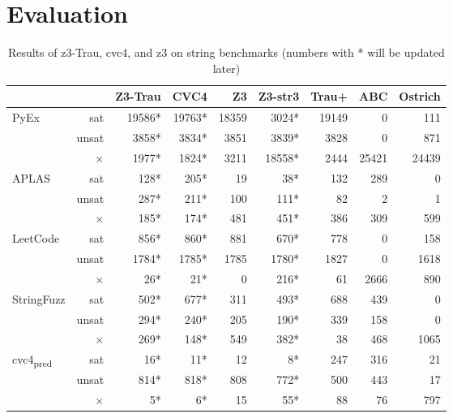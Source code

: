 \section{Evaluation}
\label{section:evaluation}



\begin{table*}[t]
\centering
\caption{Results of z3-Trau, cvc4, and z3 on string benchmarks (numbers with * will be updated later)}
\begin{tabular}{l r | r r r r r r r}
\hline
\multicolumn{2}{c}{}                   & Z3-Trau & CVC4  &    Z3 & Z3-str3 & Trau+ & ABC & Ostrich \\ \hline
\multirow{3}{*}{PyEx}		& sat      & 19586*   & 19763* & 18359 &   3024*  & 19149 & 0 & 111 \\ 
							& unsat    &  3858*   &  3834* &  3851 &   3839*  & 3828 & 0 & 871 \\
							& $\times$ &  1977*   &  1824* &  3211 &  18558*  & 2444 & 25421 & 24439 \\ \hline
\multirow{3}{*}{APLAS}		& sat      &   128*   &   205* &    19 &     38*  & 132 & 289 & 0 \\
							& unsat    &   287*   &   211* &   100 &    111*  & 82 & 2 & 1 \\
							& $\times$ &   185*   &   174* &   481 &    451*  & 386 & 309 & 599 \\ \hline
\multirow{3}{*}{LeetCode}	& sat      &   856*   &   860* &   881 &    670*  & 778 & 0 & 158 \\
							& unsat    &  1784*   &  1785* &  1785 &   1780*  & 1827 & 0 & 1618 \\
							& $\times$ &    26*   &    21* &     0 &    216*  & 61 & 2666 & 890 \\ \hline
\multirow{3}{*}{StringFuzz}	& sat      &   502*   &   677* &   311 &    493*  & 688 & 439 & 0 \\
							& unsat    &   294*   &   240* &   205 &    190*  & 339 & 158 & 0 \\
							& $\times$ &   269*   &   148* &   549 &    382*  & 38 & 468 & 1065 \\
\multirow{3}{*}{cvc4\textsubscript{pred}} & sat & 16* & 11* &   12 &      8*  & 247 & 316 & 21 \\
							& unsat    &   814*   &   818* &   808 &    772*  & 500 & 443 & 17 \\
							& $\times$ &     5*   &     6* &    15 &     55*  & 88 & 76 & 797 \\ \hline

\end{tabular}
\end{table*}

